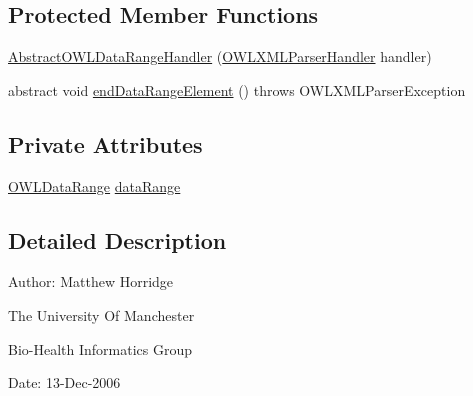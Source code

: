 \subsection*{Protected Member Functions}
\begin{DoxyCompactItemize}
\item 
\hyperlink{classorg_1_1coode_1_1owlapi_1_1owlxmlparser_1_1_abstract_o_w_l_data_range_handler_ada2d66974a8cf6b584c70dacb45b8f67}{Abstract\-O\-W\-L\-Data\-Range\-Handler} (\hyperlink{classorg_1_1coode_1_1owlapi_1_1owlxmlparser_1_1_o_w_l_x_m_l_parser_handler}{O\-W\-L\-X\-M\-L\-Parser\-Handler} handler)
\item 
abstract void \hyperlink{classorg_1_1coode_1_1owlapi_1_1owlxmlparser_1_1_abstract_o_w_l_data_range_handler_a5415441dee5284daed2bde817d492017}{end\-Data\-Range\-Element} ()  throws O\-W\-L\-X\-M\-L\-Parser\-Exception
\end{DoxyCompactItemize}
\subsection*{Private Attributes}
\begin{DoxyCompactItemize}
\item 
\hyperlink{interfaceorg_1_1semanticweb_1_1owlapi_1_1model_1_1_o_w_l_data_range}{O\-W\-L\-Data\-Range} \hyperlink{classorg_1_1coode_1_1owlapi_1_1owlxmlparser_1_1_abstract_o_w_l_data_range_handler_ab66c7043a6c6e9950a36e1ed6a0c9546}{data\-Range}
\end{DoxyCompactItemize}


\subsection{Detailed Description}
Author\-: Matthew Horridge\par
 The University Of Manchester\par
 Bio-\/\-Health Informatics Group\par
 Date\-: 13-\/\-Dec-\/2006\par
 \par
 

